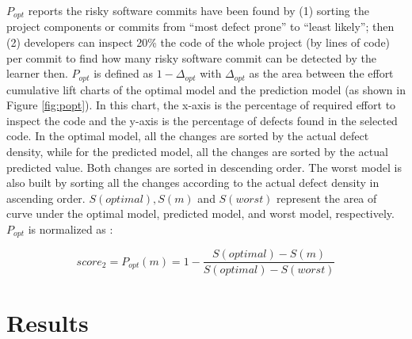 \documentclass[10pt,conference]{IEEEtran}
\begin{document}
$P_{opt}$ reports the risky software commits have been found by (1) sorting the project components or commits from ``most defect prone'' to ``least likely''; then (2) developers can inspect 20\% the code of the whole project (by lines of code) per commit to find how many risky software commit can be detected by the learner then.  $P_{opt}$ is defined as $1 - \Delta_{opt}$ with $\Delta_{opt}$ as the area between the effort cumulative lift charts of the optimal model and the prediction model (as shown in Figure \ref{fig:popt}). In this chart, the x-axis is the
percentage of required effort to inspect the code and the y-axis is
the percentage of defects found in the selected code. In the optimal
model, all the changes are sorted by the actual defect density, while for the predicted model, all the changes are sorted by the actual predicted value. Both changes are sorted in descending order. The worst model is also built by sorting all the changes according
to the actual defect density in ascending order.
$S(optimal), S(m)$ and $S(worst)$ represent the area of curve
under the optimal model, predicted model, and worst model, respectively. $P_{opt}$ is normalized as  \cite{yang16effort, kamei12_jit, monden13cost}:

\begin{equation}
 \mathit{score_2} = \mathit{P_{opt}(m)} = 1 - \frac{S(optimal) - S(m)}{S(optimal) - S(worst)}
\end{equation}





\section{Results}
\end{document}
